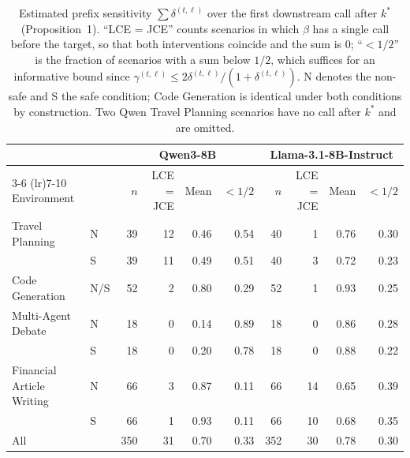 \begin{table}[t]
\centering
\caption{Estimated prefix sensitivity $\sum \delta^{(t,\ell)}$ over the first downstream call after $k^*$ (Proposition~1). ``LCE = JCE'' counts scenarios in which $\beta$ has a single call before the target, so that both interventions coincide and the sum is $0$; ``$<1/2$'' is the fraction of scenarios with a sum below $1/2$, which suffices for an informative bound since $\gamma^{(t,\ell)} \le 2\delta^{(t,\ell)}/(1+\delta^{(t,\ell)})$. N denotes the non-safe and S the safe condition; Code Generation is identical under both conditions by construction. Two Qwen Travel Planning scenarios have no call after $k^*$ and are omitted.}
\label{tab:prefix-sensitivity}
\small
\begin{tabular}{llrrrrrrrr}
\toprule
 & & \multicolumn{4}{c}{Qwen3-8B} & \multicolumn{4}{c}{Llama-3.1-8B-Instruct} \\
\cmidrule(lr){3-6} \cmidrule(lr){7-10}
Environment & & $n$ & LCE = JCE & Mean & $<1/2$ & $n$ & LCE = JCE & Mean & $<1/2$ \\
\midrule
Travel Planning & N & 39 & 12 & 0.46 & 0.54 & 40 & 1 & 0.76 & 0.30 \\
 & S & 39 & 11 & 0.49 & 0.51 & 40 & 3 & 0.72 & 0.23 \\
Code Generation & N/S & 52 & 2 & 0.80 & 0.29 & 52 & 1 & 0.93 & 0.25 \\
Multi-Agent Debate & N & 18 & 0 & 0.14 & 0.89 & 18 & 0 & 0.86 & 0.28 \\
 & S & 18 & 0 & 0.20 & 0.78 & 18 & 0 & 0.88 & 0.22 \\
Financial Article Writing & N & 66 & 3 & 0.87 & 0.11 & 66 & 14 & 0.65 & 0.39 \\
 & S & 66 & 1 & 0.93 & 0.11 & 66 & 10 & 0.68 & 0.35 \\
\midrule
All & & 350 & 31 & 0.70 & 0.33 & 352 & 30 & 0.78 & 0.30 \\
\bottomrule
\end{tabular}
\end{table}
